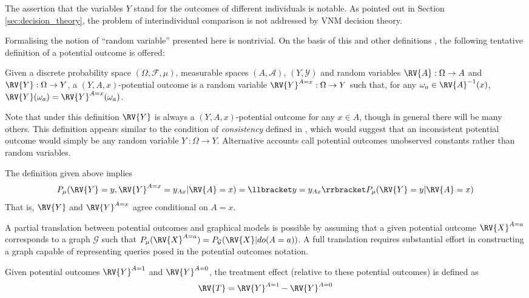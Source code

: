 The assertion that the variables $Y$ stand for the outcomes of different individuals is notable. As pointed out in Section \ref{sec:decision_theory}, the problem of interindividual comparison is not addressed by VNM decision theory.

Formalising the notion of ``random variable'' presented here is nontrivial. On the basis of this and other definitions \cite{angrist_mastering_2014,rubin_causal_2005}, the following tentative definition of a potential outcome is offered:

\begin{definition}
Given a discrete probability space $(\Omega, \mathcal{F},\mu)$, measurable spaces $(A,\mathcal{A})$, $(Y,\mathcal{Y})$ and random variables $\RV{A}:\Omega\to A$ and $\RV{Y}:\Omega\to Y$, a $(Y,A,x)$-potential outcome is a random variable $\RV{Y}^{A=x}:\Omega\to Y$ such that, for any $\omega_a\in \RV{A}^{-1}(x)$, $\RV{Y}(\omega_a)=\RV{Y}^{A=x}(\omega_a)$.
\end{definition}

Note that under this definition $\RV{Y}$ is always a $(Y,A,x)$-potential outcome for any $x\in A$, though in general there will be many others. This definition appears similar to the condition of \emph{consistency} defined in \cite{hernan_does_2008}, which would suggest that an inconsistent potential outcome would simply be any random variable $Y^\cdot:\Omega \to Y$. Alternative accounts call potential outcomes unobserved constants rather than random variables\cite{angrist_identification_1996}.

The definition given above implies
\[P_{\mu}(\RV{Y}=y,\RV{Y}^{A=x}=y_{Ax}|\RV{A}=x) = \llbracket y=y_{Ax} \rrbracket P_\mu(\RV{Y}=y|\RV{A}=x)\]
That is, $\RV{Y}$ and $\RV{Y}^{A=x}$ agree conditional on $A=x$.

A partial translation between potential outcomes and graphical models is possible by assuming that a given potential outcome $\RV{X}^{A=a}$ corresponds to a graph $\mathcal{G}$ such that $P_\mu(\RV{X}^{A=a})=P_{\mathcal{G}}(\RV{X}|do(A=a))$. A full translation requires substantial effort in constructing a graph capable of representing queries posed in the potential outcomes notation\cite{shpitser_complete_2008}.

\label{sec:treatment_effect}

Given potential outcomes $\RV{Y}^{A=1}$ and $\RV{Y}^{A=0}$, the treatment effect (relative to these potential outcomes) is defined as 
\begin{align}
    \RV{T} = \RV{Y}^{A=1} - \RV{Y}^{A=0}
\end{align}

